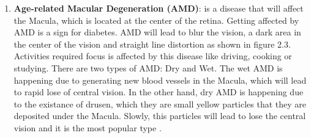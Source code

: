 \begin{enumerate}
\item \textbf{Age-related Macular Degeneration (AMD)}: is a disease that will affect the Macula, which is located at the center of the retina.
Getting affected by AMD is a sign for diabetes.
AMD will lead to blur the vision, a dark area in the center of the vision and straight line distortion as shown in figure 2.3.
Activities required focus is affected by this disease like driving, cooking or studying.
There are two types of AMD: Dry and Wet. 
The wet AMD is happening due to generating new blood vessels in the Macula, which will lead to rapid lose of central vision.
In the other hand, dry AMD is happening due to the existance of drusen, which they are small yellow particles that they are deposited under the Macula.
Slowly, this particles will lead to lose the central vision and it is the most popular type \cite{bressler1988age}.
 

\end{enumerate}
